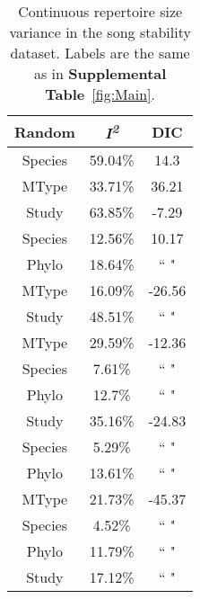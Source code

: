 \documentclass{article}
\begin{document}
  \begin{table}[H]
  \centering
  \caption{Continuous repertoire size variance in the song stability dataset. Labels are the same as in \textbf{Supplemental Table}~\ref{fig:Main}.} 
  \begin{tabular}{ccc}
  \hline
  Random & \textit{I\textsuperscript{2}} & DIC \\ 
  \hline
  Species & 59.04\% & 14.3 \\ \hdashline
  MType & 33.71\% & 36.21 \\ \hdashline
  Study & 63.85\% & -7.29 \\ \hdashline
  Species & 12.56\% & 10.17 \\ 
  Phylo & 18.64\% & `` " \\ \hdashline
  MType & 16.09\% & -26.56 \\ 
  Study & 48.51\% & `` " \\ \hdashline
  MType & 29.59\% & -12.36 \\ 
  Species & 7.61\% & `` " \\ 
  Phylo & 12.7\% & `` " \\ \hdashline
  Study & 35.16\% & -24.83 \\ 
  Species & 5.29\% & `` " \\ 
  Phylo & 13.61\% & `` " \\ \hdashline
  MType & 21.73\% & -45.37 \\ 
  Species & 4.52\% & `` " \\ 
  Phylo & 11.79\% & `` " \\ 
  Study & 17.12\% & `` " \\ 
  \hline
  \end{tabular}
  \end{table}
  
\end{document}
